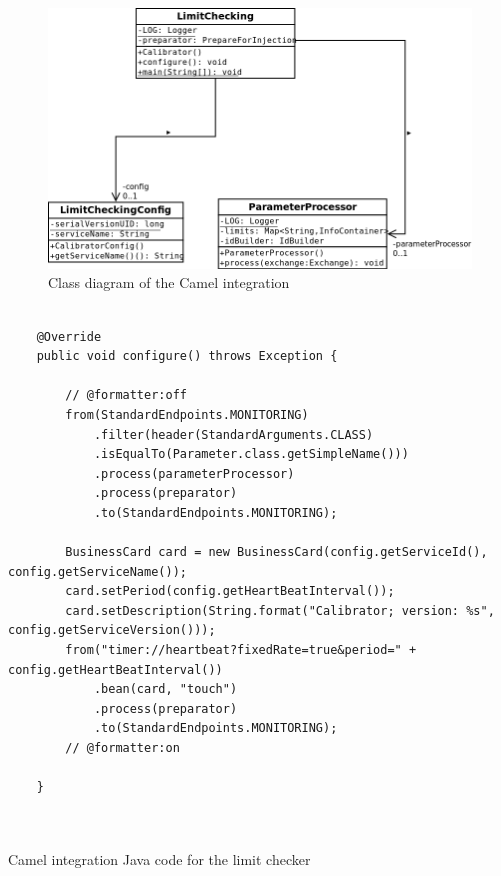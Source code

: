 \begin{figure}[H]
\centerline{\includegraphics[width=1\textwidth]{images/LimitCheckingCamelClassDiagram.png}}
\caption{Class diagram of the Camel integration}
\label{f5.7}
\end{figure}
\pagebreak
\begin{table}[H]
\lstset{language=Java}
\begin{lstlisting}

    @Override
    public void configure() throws Exception {

        // @formatter:off
        from(StandardEndpoints.MONITORING)
            .filter(header(StandardArguments.CLASS)
            .isEqualTo(Parameter.class.getSimpleName()))
            .process(parameterProcessor)
            .process(preparator)
            .to(StandardEndpoints.MONITORING);
        
        BusinessCard card = new BusinessCard(config.getServiceId(), config.getServiceName());
        card.setPeriod(config.getHeartBeatInterval());
        card.setDescription(String.format("Calibrator; version: %s", config.getServiceVersion()));
        from("timer://heartbeat?fixedRate=true&period=" + config.getHeartBeatInterval())
            .bean(card, "touch")
            .process(preparator)
            .to(StandardEndpoints.MONITORING);
        // @formatter:on

    }



\end{lstlisting}
\caption{Camel integration Java code for the limit checker}
\label{Table5.5}
\end{table}

\pagebreak

